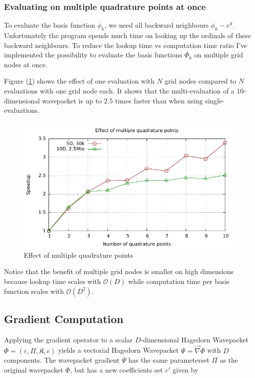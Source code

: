 \documentclass{article}
\begin{document}
\subsubsection{Evaluating on multiple quadrature points at once}

To evaluate the basis function \(\phi_k\), we need all backward neighbours
\(\phi_k-e^d\).
Unfortunately the program spends much time on looking up the ordinals of these
backward neighbours. To reduce the lookup time vs computation time ratio
I've implemented the possibility to evaluate the basis functions \(\Phi_k\)
on multiple grid nodes at once.

Figure (\ref{fig:hawp_eval_multiqp}) shows the effect of one
evaluation with \(N\) grid nodes compared to \(N\) evaluations with one
grid node each. It shows that the multi-evaluation of a \(10\)-dimensional
wavepacket is up to \(2.5\) times faster than when using single-evaluations.

\begin{figure}[H]
  \centering
  \includegraphics[width=1.0\textwidth]{plots/hawp_eval_multiqp}
  \caption{Effect of multiple quadrature points}
  \label{fig:hawp_eval_multiqp}
\end{figure}

Notice that the benefit of multiple grid nodes is smaller on high dimensions because
lookup time scales with \(\mathcal{O}(D)\) while computation time per basis function
scales with \(\mathcal{O}(D^2)\).

\subsection{Gradient Computation}
Applying the gradient operator to a scalar \(D\)-dimensional Hagedorn Wavepacket 
\( \Phi = \left( \varepsilon, \Pi, \mathfrak{K}, c \right)\)
yields a vectorial Hagedorn Wavepacket \(\Psi=\vec{\nabla}\Phi\) with \(D\) components.
The wavepacket gradient \(\Psi\) has the same parameterset \(\Pi\) as the original wavepacket \(\Phi\),
but has a new coefficients set \(c'\) given by
\end{document}
